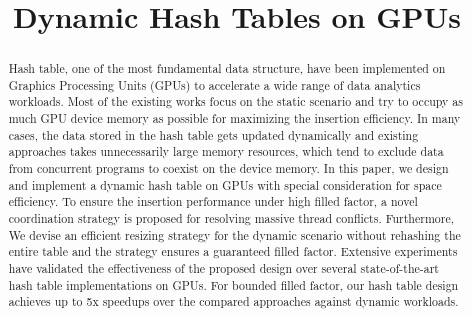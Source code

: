 \documentclass{vldb}
\begin{document}
\title{Dynamic Hash Tables on GPUs}




\maketitle

\begin{abstract}
Hash table, one of the most fundamental data structure,
have been implemented on Graphics Processing Units (GPUs) to accelerate a wide range of data analytics workloads. Most of the existing works focus on the static scenario and try to occupy as much GPU device memory as possible for maximizing the insertion efficiency. In many cases, the data stored in the hash table gets updated dynamically and existing approaches takes unnecessarily large memory resources, which tend to exclude data from concurrent programs to coexist on the device memory.
In this paper, we design and implement a dynamic hash table on GPUs with special consideration for space efficiency. To ensure the insertion performance under high filled factor, a novel coordination strategy is proposed for resolving massive thread conflicts. 
Furthermore,
We devise an efficient resizing strategy for the dynamic scenario without rehashing the entire table and the strategy ensures a guaranteed filled factor.
Extensive experiments have validated the effectiveness of the proposed design over several state-of-the-art hash table implementations on GPUs. For bounded filled factor, our hash table design achieves up to 5x speedups over the compared approaches against dynamic workloads. 
\end{abstract}














\pagebreak


\balance
\end{document}
